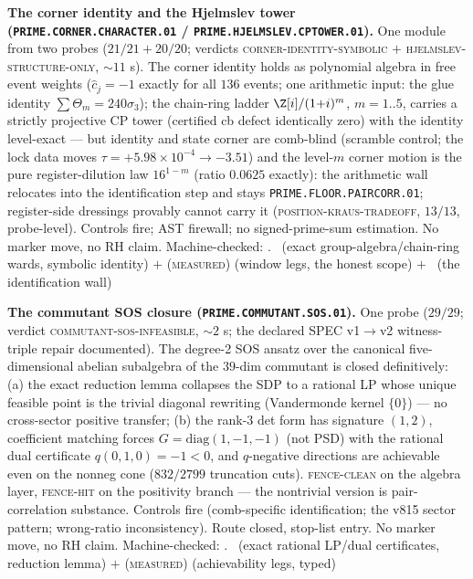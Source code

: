 \par\smallskip\noindent\textbf{The corner identity and the
Hjelmslev tower (\texttt{PRIME.CORNER.CHARACTER.01} /
\texttt{PRIME.HJELMSLEV.CPTOWER.01}).}
One module from two probes ($21/21 + 20/20$; verdicts
\textsc{corner-identity-symbolic} $+$
\textsc{hjelmslev-structure-only}, $\sim11$ s).  The corner
identity holds as polynomial algebra in free event weights
($\hat c_j = -1$ exactly for all $136$ events; one arithmetic
input: the glue identity $\sum\Theta_m = 240\sigma_3$); the
chain-ring ladder $\Z[i]/(1{+}i)^m$, $m = 1..5$, carries a
strictly projective CP tower (certified cb defect identically
zero) with the identity level-exact --- but identity and state
corner are comb-blind (scramble control; the lock data moves
$\tau = +5.98\times10^{-4} \to -3.51$) and the level-$m$ corner
motion is the pure register-dilution law $16^{1-m}$ (ratio
$0.0625$ exactly): the arithmetic wall relocates into the
identification step and stays \texttt{PRIME.FLOOR.PAIRCORR.01};
register-side dressings provably cannot carry it
(\textsc{position-kraus-tradeoff}, $13/13$, probe-level).
Controls fire; AST firewall; no signed-prime-sum estimation.  No
marker move, no RH claim.
Machine-checked: .
\mE\ (exact group-algebra/chain-ring wards, symbolic identity)
$+$ (\textsc{measured}) (window legs, the honest scope) $+$
\mO\ (the identification wall)
\par\smallskip


\par\smallskip\noindent\textbf{The commutant SOS closure
(\texttt{PRIME.COMMUTANT.SOS.01}).}
One probe ($29/29$; verdict \textsc{commutant-sos-infeasible},
$\sim2$ s; the declared SPEC v1$\to$v2 witness-triple repair
documented).  The degree-2 SOS ansatz over the canonical
five-dimensional abelian subalgebra of the $39$-dim commutant is
closed definitively: (a) the exact reduction lemma collapses the
SDP to a rational LP whose unique feasible point is the trivial
diagonal rewriting (Vandermonde kernel $\{0\}$) --- no
cross-sector positive transfer; (b) the rank-3 det form has
signature $(1,2)$, coefficient matching forces
$G = \mathrm{diag}(1,-1,-1)$ (not PSD) with the rational dual
certificate $q(0,1,0) = -1 < 0$, and $q$-negative directions are
achievable even on the nonneg cone ($832/2799$ truncation cuts).
\textsc{fence-clean} on the algebra layer, \textsc{fence-hit} on
the positivity branch --- the nontrivial version is
pair-correlation substance.  Controls fire (comb-specific
identification; the v815 sector pattern; wrong-ratio
inconsistency).  Route closed, stop-list entry.  No marker move,
no RH claim.
Machine-checked: .
\mE\ (exact rational LP/dual certificates, reduction lemma) $+$
(\textsc{measured}) (achievability legs, typed)
\par\smallskip


